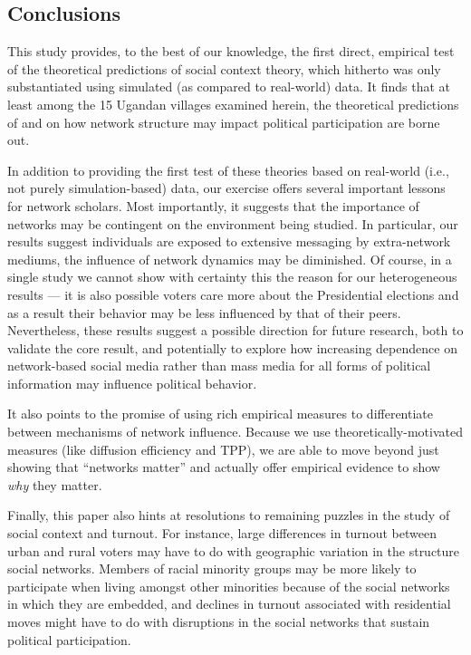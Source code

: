 \documentclass[12pt]{article}
\begin{document}
\subsection{Conclusions}

This study provides, to the best of our knowledge, the first direct, empirical test of the theoretical predictions of social context theory, which hitherto was only substantiated using simulated (as compared to real-world) data. It finds that at least among the 15 Ugandan villages examined herein, the theoretical predictions of \cite{Siegel:2009vi} and \cite{Rolfe:2012ka} on how network structure may impact political participation are borne out.

In addition to providing the first test of these theories based on real-world (i.e., not purely simulation-based) data, our exercise offers several important lessons for network scholars. Most importantly, it suggests that the importance of networks may be contingent on the environment being studied. In particular, our results suggest individuals are exposed to extensive messaging by extra-network mediums, the influence of network dynamics may be diminished. Of course, in a single study we cannot show with certainty this the reason for our heterogeneous results --- it is also possible voters care more about the Presidential elections and as a result their behavior may be less influenced by that of their peers. Nevertheless, these results suggest a possible direction for future research, both to validate the core result, and potentially to explore how increasing dependence on network-based social media rather than mass media for all forms of political information may influence political behavior.

It also points to the promise of using rich empirical measures to differentiate between mechanisms of network influence. Because we use theoretically-motivated measures (like diffusion efficiency and TPP), we are able to move beyond just showing that ``networks matter'' and actually offer empirical evidence to show \emph{why} they matter.

Finally, this paper also hints at resolutions to remaining puzzles in the study of social context and turnout.  For instance, large differences in turnout between urban and rural voters may have to do with geographic variation in the structure social networks.  Members of racial minority groups may be more likely to participate when living amongst other minorities because of the social networks in which they are embedded, and declines in turnout associated with residential moves might have to do with disruptions in the social networks that sustain political participation.
\end{document}
